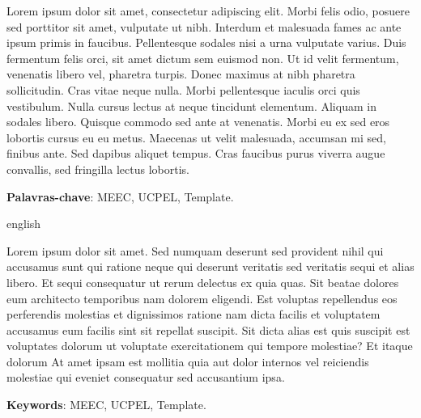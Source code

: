 \begin{resumo}

    Lorem ipsum dolor sit amet, consectetur adipiscing elit. Morbi felis odio, posuere sed porttitor sit amet, vulputate ut nibh. Interdum et malesuada fames ac ante ipsum primis in faucibus. Pellentesque sodales nisi a urna vulputate varius. Duis fermentum felis orci, sit amet dictum sem euismod non. Ut id velit fermentum, venenatis libero vel, pharetra turpis. Donec maximus at nibh pharetra sollicitudin. Cras vitae neque nulla. Morbi pellentesque iaculis orci quis vestibulum. Nulla cursus lectus at neque tincidunt elementum. Aliquam in sodales libero. Quisque commodo sed ante at venenatis. Morbi eu ex sed eros lobortis cursus eu eu metus. Maecenas ut velit malesuada, accumsan mi sed, finibus ante. Sed dapibus aliquet tempus. Cras faucibus purus viverra augue convallis, sed fringilla lectus lobortis.

    \vspace{\onelineskip}
    
    \noindent\textbf{Palavras-chave}: MEEC, UCPEL, Template.
    
\end{resumo}

\begin{resumo}[Abstract]
\begin{otherlanguage*}{english}
    
    Lorem ipsum dolor sit amet. Sed numquam deserunt sed provident nihil qui accusamus sunt qui ratione neque qui deserunt veritatis sed veritatis sequi et alias libero. Et sequi consequatur ut rerum delectus ex quia quas. Sit beatae dolores eum architecto temporibus nam dolorem eligendi. Est voluptas repellendus eos perferendis molestias et dignissimos ratione nam dicta facilis et voluptatem accusamus eum facilis sint sit repellat suscipit. Sit dicta alias est quis suscipit est voluptates dolorum ut voluptate exercitationem qui tempore molestiae? Et itaque dolorum At amet ipsam est mollitia quia aut dolor internos vel reiciendis molestiae qui eveniet consequatur sed accusantium ipsa.
    
    \vspace{\onelineskip}
    
    \noindent\textbf{Keywords}: MEEC, UCPEL, Template.
\end{otherlanguage*}
\end{resumo}
